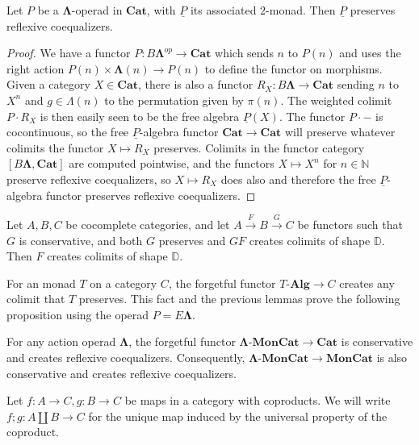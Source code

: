 \documentclass{amsbook} %
\newcommand{\mb}{\mathbf}
\newcommand{\und}[1]{\ensuremath{\underline{#1}}}
\newcommand{\ML}{\mathbf{\Lambda}}
\newcommand{\moncat}{\ensuremath{\mb{MonCat}}}
\newcommand{\cat}{\ensuremath{\mb{Cat}}}
\newcommand{\Alg}{\mbox{-}\mb{Alg}}
\numberwithin{section}{chapter}
\begin{document}
\begin{lem}\label{P_pres_refl}
Let $P$ be a $\ML$-operad in $\cat$, with $\und{P}$ its associated 2-monad. Then $\und{P}$ preserves reflexive coequalizers.

\end{lem}
\begin{proof}
We have a functor $P:B\ML^{op} \to \cat$ which sends $n$ to $P(n)$ and uses the right action $P(n) \times \ML(n) \to P(n)$ to define the functor on morphisms. Given a category $X \in \cat$, there is also a functor $R_X:B\ML \to \cat$ sending $n$ to $X^n$ and $g \in \Lambda(n)$ to the permutation given by $\pi(n)$. The weighted colimit $P \cdot R_X$ is then easily seen to be the free algebra $\und{P}(X)$. The functor $P \cdot -$ is cocontinuous, so the free $\und{P}$-algebra functor $\cat \to \cat$ will preserve whatever colimits the functor $X \mapsto R_X$ preserves. Colimits in the functor category $[B\ML, \cat]$ are computed pointwise, and the functors $X \mapsto X^n$ for $n \in \mathbb{N}$ preserve reflexive coequalizers, so $X \mapsto R_X$ does also and therefore the free $\und{P}$-algebra functor preserves reflexive coequalizers.
\end{proof}

\begin{lem}\label{creation_triangle}
Let $A,B,C$ be cocomplete categories, and let $A \stackrel{F}{\to} B \stackrel{G}{\to} C$ be functors such that $G$ is conservative, and both $G$ preserves and $GF$ creates colimits of shape $\mathbb{D}$. Then $F$ creates colimits of shape $\mathbb{D}$.
\end{lem}

For an monad $T$ on a category $C$, the forgetful functor $T\Alg \to C$ creates any colimit that $T$ preserves. This fact and the previous lemmas prove the following proposition using the operad $P = E\ML$.
\begin{prop}\label{refcoeq_calcs}
For any action operad $\ML$, the forgetful functor $\ML\mbox{-}\moncat \to \cat$ is conservative and creates reflexive coequalizers. Consequently, $\ML\mbox{-}\moncat \to \moncat$ is also conservative and creates reflexive coequalizers.

\end{prop}

\begin{nota}\label{plus_notation}
Let $f: A \to C, g: B \to C$ be maps in a category with coproducts. We will write $f;g: A \coprod B \to C$ for the unique map induced by the universal property of the coproduct.
\end{nota}
\end{document}
